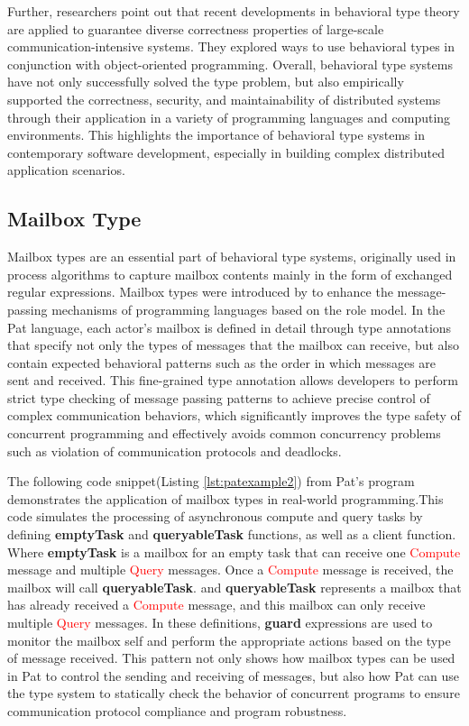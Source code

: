 \documentclass{l4proj}
\begin{document}
Further, \cite{ancona_2016_behavioral} researchers point out that recent developments in behavioral type theory are applied to guarantee diverse correctness properties of large-scale communication-intensive systems. They explored ways to use behavioral types in conjunction with object-oriented programming. Overall, behavioral type systems have not only successfully solved the type problem, but also empirically supported the correctness, security, and maintainability of distributed systems through their application in a variety of programming languages and computing environments. This highlights the importance of behavioral type systems in contemporary software development, especially in building complex distributed application scenarios.

\subsection{Mailbox Type}
Mailbox types are an essential part of behavioral type systems, originally used in process algorithms to capture mailbox contents mainly in the form of exchanged regular expressions. Mailbox types were introduced by \cite{deaposliguoro_2018_mailbox} to enhance the message-passing mechanisms of programming languages based on the role model. In the Pat language, each actor's mailbox is defined in detail through type annotations that specify not only the types of messages that the mailbox can receive, but also contain expected behavioral patterns such as the order in which messages are sent and received. This fine-grained type annotation allows developers to perform strict type checking of message passing patterns to achieve precise control of complex communication behaviors, which significantly improves the type safety of concurrent programming and effectively avoids common concurrency problems such as violation of communication protocols and deadlocks.

The following code snippet(Listing \ref{lst:patexample2}) from Pat's program demonstrates the application of mailbox types in real-world programming.This code simulates the processing of asynchronous compute and query tasks by defining \textbf{emptyTask} and \textbf{queryableTask} functions, as well as a client function. Where \textbf{emptyTask} is a mailbox for an empty task that can receive one \textcolor{red}{Compute} message and multiple \textcolor{red}{Query} messages. Once a \textcolor{red}{Compute} message is received, the mailbox will call \textbf{queryableTask}. and \textbf{queryableTask} represents a mailbox that has already received a \textcolor{red}{Compute} message, and this mailbox can only receive multiple \textcolor{red}{Query} messages. In these definitions, \textbf{guard} expressions are used to monitor the mailbox self and perform the appropriate actions based on the type of message received. This pattern not only shows how mailbox types can be used in Pat to control the sending and receiving of messages, but also how Pat can use the type system to statically check the behavior of concurrent programs to ensure communication protocol compliance and program robustness.
\end{document}
